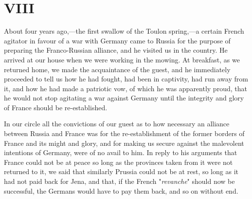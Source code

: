 \documentclass{book}
\begin{document}
\chapter{VIII}
\label{chapter-8}
About four years ago,—the first swallow of the Toulon spring,—a certain French agitator in favour of a war with Germany came to Russia for the purpose of preparing the Franco-Russian alliance, and he visited us in the country. He arrived at our house when we were working in the mowing. At breakfast, as we returned home, we made the acquaintance of the guest, and he immediately proceeded to tell us how he had fought, had been in captivity, had run away from it, and how he had made a patriotic vow, of which he was apparently proud, that he would not stop agitating a war against Germany until the integrity and glory of France should be re-established.

In our circle all the convictions of our guest as to how necessary an alliance between Russia and France was for the re-establishment of the former borders of France and its might and glory, and for making us secure against the malevolent intentions of Germany, were of no avail to him. In reply to his arguments that France could not be at peace so long as the provinces taken from it were not returned to it, we said that similarly Prussia could not be at rest, so long as it had not paid back for Jena, and that, if the French "\emph{revanche}" should now be successful, the Germans would have to pay them back, and so on without end.
\end{document}
